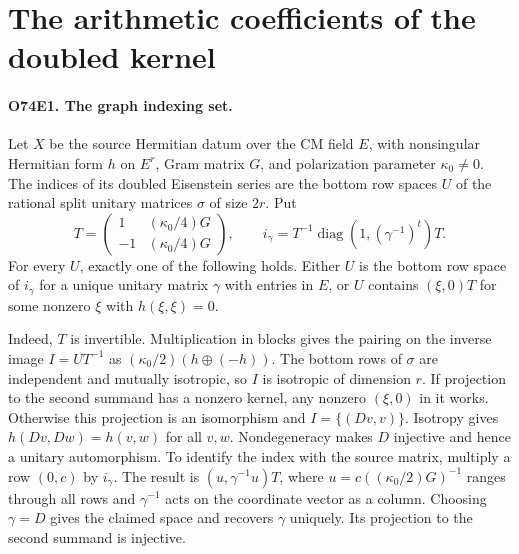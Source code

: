 \section{The arithmetic coefficients of the doubled kernel}

\paragraph{O74E1. The graph indexing set.}
Let $X$ be the source Hermitian datum over the CM field $E$, with
nonsingular Hermitian form $h$ on $E^r$, Gram matrix $G$, and
polarization parameter $\kappa_0\ne0$. The indices of its doubled
Eisenstein series are the bottom row spaces $U$ of the rational
split unitary matrices $\sigma$ of size $2r$. Put
\[
 T=\begin{pmatrix}1&(\kappa_0/4)G\\-1&(\kappa_0/4)G\end{pmatrix},
 \qquad i_\gamma=T^{-1}\operatorname{diag}
       (1,(\gamma^{-1})^{t})T .
\]
For every $U$, exactly one of the following holds. Either $U$ is the
bottom row space of $i_\gamma$ for a unique unitary matrix $\gamma$ with entries in $E$,
or $U$ contains $(\xi,0)T$ for some nonzero $\xi$ with $h(\xi,\xi)=0$.

Indeed, $T$ is invertible. Multiplication in blocks gives the pairing
on the inverse image $I=UT^{-1}$ as $(\kappa_0/2)(h\oplus(-h))$.
The bottom rows of $\sigma$ are independent and mutually isotropic,
so $I$ is isotropic of dimension $r$. If projection to the second
summand has a nonzero kernel, any nonzero $(\xi,0)$ in it works.
Otherwise this projection is an isomorphism and $I=\{(Dv,v)\}$.
Isotropy gives $h(Dv,Dw)=h(v,w)$ for all $v,w$. Nondegeneracy makes
$D$ injective and hence a unitary automorphism. To identify the
index with the source matrix, multiply a row $(0,c)$ by $i_\gamma$.
The result is $(u,\gamma^{-1}u)T$, where
$u=c((\kappa_0/2)G)^{-1}$ ranges through all rows and
$\gamma^{-1}$ acts on the coordinate vector as a column.
Choosing $\gamma=D$ gives the claimed space and recovers $\gamma$
uniquely. Its projection to the second summand is injective.

